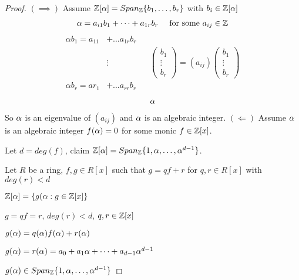 \documentclass[11pt]{article}
\begin{document}
\begin{proof}
	$(\implies)$ Assume $\mathbb{Z}[\alpha] = Span_{\mathbb{Z}}\{b_1, \dots, b_r \}$ with $b_i \in \mathbb{Z}[\alpha]$
	\begin{align*}
		\alpha = a_{i1}b_1 + \dots + a_{1r}b_r && \text{ for some } a_{ij} \in \mathbb{Z}
	\end{align*}
	\begin{align*}
		\alpha b_1 = a_{11}& + \dots a_{1r}b_r \\ 
		&\vdots&& 	\begin{pmatrix}
b_1\\
\vdots\\
b_r
		\end{pmatrix}
		 = 
		 (a_{ij}) 
		\begin{pmatrix}
b_1\\
\vdots\\
b_r
		\end{pmatrix}
\\
		\alpha b_r = a r_1& + \dots a_{rr}b_r
	\end{align*}
	\begin{align*}
		\alpha
	\end{align*}
	So $\alpha$ is an eigenvalue of $(a_{ij})$ and $\alpha$ is an algebraic integer.
	\spac $(\Longleftarrow)$ Assume $\alpha$ is an algebraic integer $f(\alpha)=0$ for some monic $ f \in \mathbb{Z}[x]$.
	
	Let $d=deg(f)$, claim $\mathbb{Z}[\alpha] = Span_{\mathbb{Z}}\{1,\alpha, \dots, \alpha^{d-1} \}$.

	Let $R$ be a ring, $f,g \in R[x]$ such that $g=qf+r$ for $q,r \in R[x]$ with $deg(r)<d$
\spa

	$\mathbb{Z}[\alpha]=\{g(\alpha : g \in \mathbb{Z}[x]\}$
	\spa

	$g = qf=r$, \hspace{7pt} $deg(r) < d$, \hspace{7pt} $q,r \in \mathbb{Z}[x]$
\spa

	$g(\alpha) = q(\alpha)f(\alpha) + r(\alpha)$
	\spa

	$g(\alpha) = r(\alpha) = a_0 + a_1\alpha + \dots + a_{d-1} \alpha^{d-1}$
	\spa

	$g(\alpha) \in Span_{\mathbb{Z}} \{ 1, \alpha, \dots, \alpha^{d-1} \} $
\end{proof}
\end{document}
